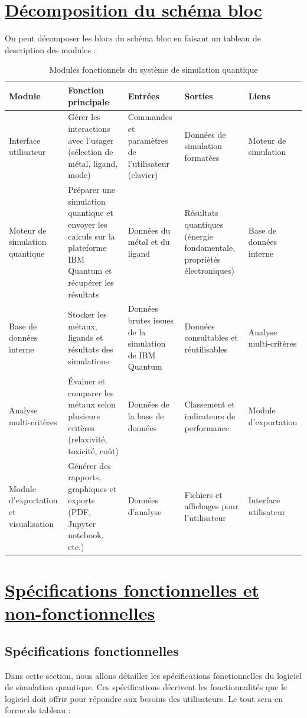 \documentclass[11pt]{article}
\begin{document}
\section{\underline{Décomposition du schéma bloc}}
On peut décomposer les blocs du schéma bloc en faisant un tableau de description des modules :
\begin{table}[h!]
\centering
\caption{Modules fonctionnels du système de simulation quantique}
\begin{tabular}{|p{3cm}|p{4cm}|p{3cm}|p{3cm}|p{2cm}|}
\hline
\textbf{Module} & \textbf{Fonction principale} & \textbf{Entrées} & \textbf{Sorties} & \textbf{Liens} \\
\hline
Interface utilisateur & Gérer les interactions avec l’usager (sélection de métal, ligand, mode) & Commandes et paramètres de l’utilisateur (clavier)& Données de simulation formatées & Moteur de simulation \\
\hline
Moteur de simulation quantique & Préparer une simulation quantique et envoyer les calculs sur la plateforme IBM Quantum et récupérer les résultats & Données du métal et du ligand & Résultats quantiques (énergie fondamentale, propriétés électroniques) & Base de données interne \\
\hline
Base de données interne & Stocker les métaux, ligands et résultats des simulations & Données brutes issues de la simulation de IBM Quantum & Données consultables et réutilisables & Analyse multi-critères \\
\hline
Analyse multi-critères & Évaluer et comparer les métaux selon plusieurs critères (relaxivité, toxicité, coût) & Données de la base de données & Classement et indicateurs de performance & Module d’exportation \\
\hline
Module d’exportation et visualisation & Générer des rapports, graphiques et exports (PDF, Jupyter notebook, etc.) & Données d’analyse & Fichiers et affichages pour l’utilisateur & Interface utilisateur \\
\hline
\end{tabular}
\end{table}

\newpage

\section{\underline{Spécifications fonctionnelles et non-fonctionnelles}}

\subsection{Spécifications fonctionnelles}
Dans cette section, nous allons détailler les spécifications fonctionnelles du logiciel de simulation quantique. Ces spécifications décrivent les fonctionnalités que le logiciel doit offrir pour répondre aux besoins des utilisateurs. Le tout sera en forme de tableau : 
\end{document}
